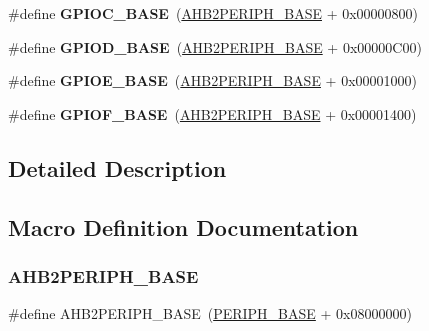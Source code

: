 \begin{DoxyCompactItemize}
\#define {\bfseries G\+P\+I\+O\+C\+\_\+\+B\+A\+SE}~(\hyperlink{group___peripheral__memory__map_gaeedaa71d22a1948492365e2cd26cfd46}{A\+H\+B2\+P\+E\+R\+I\+P\+H\+\_\+\+B\+A\+SE} + 0x00000800)
\item 
\mbox{\label{group___peripheral__memory__map_ga1a93ab27129f04064089616910c296ec}} 
\#define {\bfseries G\+P\+I\+O\+D\+\_\+\+B\+A\+SE}~(\hyperlink{group___peripheral__memory__map_gaeedaa71d22a1948492365e2cd26cfd46}{A\+H\+B2\+P\+E\+R\+I\+P\+H\+\_\+\+B\+A\+SE} + 0x00000\+C00)
\item 
\mbox{\label{group___peripheral__memory__map_gab487b1983d936c4fee3e9e88b95aad9d}} 
\#define {\bfseries G\+P\+I\+O\+E\+\_\+\+B\+A\+SE}~(\hyperlink{group___peripheral__memory__map_gaeedaa71d22a1948492365e2cd26cfd46}{A\+H\+B2\+P\+E\+R\+I\+P\+H\+\_\+\+B\+A\+SE} + 0x00001000)
\item 
\mbox{\label{group___peripheral__memory__map_ga7f9a3f4223a1a784af464a114978d26e}} 
\#define {\bfseries G\+P\+I\+O\+F\+\_\+\+B\+A\+SE}~(\hyperlink{group___peripheral__memory__map_gaeedaa71d22a1948492365e2cd26cfd46}{A\+H\+B2\+P\+E\+R\+I\+P\+H\+\_\+\+B\+A\+SE} + 0x00001400)
\end{DoxyCompactItemize}


\subsection{Detailed Description}


\subsection{Macro Definition Documentation}
\mbox{\label{group___peripheral__memory__map_gaeedaa71d22a1948492365e2cd26cfd46}} 
\subsubsection{\texorpdfstring{A\+H\+B2\+P\+E\+R\+I\+P\+H\+\_\+\+B\+A\+SE}{AHB2PERIPH\_BASE}\hspace{0.1cm}{\footnotesize\ttfamily [1/16]}}
{\footnotesize\ttfamily \#define A\+H\+B2\+P\+E\+R\+I\+P\+H\+\_\+\+B\+A\+SE~(\hyperlink{group___peripheral__memory__map_ga9171f49478fa86d932f89e78e73b88b0}{P\+E\+R\+I\+P\+H\+\_\+\+B\+A\+SE} + 0x08000000)}

